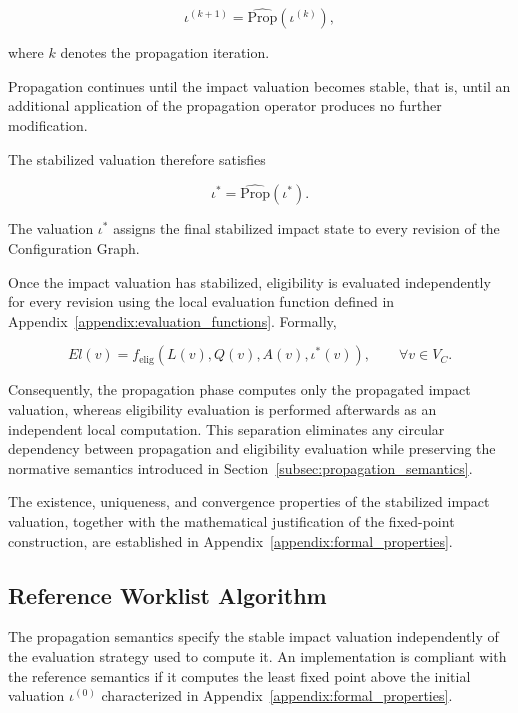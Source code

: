 \documentclass[10pt]{article}
\begin{document}
\begin{equation}
	\label{eq:impact_iteration}
	\iota^{(k+1)}
	=
	\widehat{\mathrm{Prop}}
	\!\left(
	\iota^{(k)}
	\right),
\end{equation}

where $k$ denotes the propagation iteration.

Propagation continues until the impact valuation becomes stable, that is, until an additional application of the propagation operator produces no further modification.

The stabilized valuation therefore satisfies

\begin{equation}
	\label{eq:impact_fixed_point}
	\iota^{*}
	=
	\widehat{\mathrm{Prop}}
	\!\left(
	\iota^{*}
	\right).
\end{equation}

The valuation $\iota^{*}$ assigns the final stabilized impact state to every
revision of the Configuration Graph.

Once the impact valuation has stabilized, eligibility is evaluated
independently for every revision using the local evaluation function defined in Appendix~\ref{appendix:evaluation_functions}. Formally,

\begin{equation}
	\label{eq:eligibility_after_propagation}
	El(v)
	=
	f_{\mathrm{elig}}
	\!\left(
	L(v),
	Q(v),
	A(v),
	\iota^{*}(v)
	\right),
	\qquad
	\forall v\in V_C.
\end{equation}

Consequently, the propagation phase computes only the propagated impact valuation, whereas eligibility evaluation is performed afterwards as an independent local computation. This separation eliminates any circular dependency between propagation and eligibility evaluation while preserving the normative semantics introduced in Section~\ref{subsec:propagation_semantics}.

The existence, uniqueness, and convergence properties of the stabilized impact valuation, together with the mathematical justification of the fixed-point construction, are established in Appendix~\ref{appendix:formal_properties}.

\subsection{Reference Worklist Algorithm}
\label{appendix:ref_worklist_algo}
The propagation semantics specify the stable impact valuation independently of
the evaluation strategy used to compute it. An implementation is compliant with
the reference semantics if it computes the least fixed point above the initial
valuation $\iota^{(0)}$ characterized in
Appendix~\ref{appendix:formal_properties}.
\end{document}
